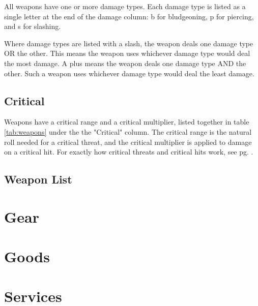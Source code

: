 \begin{multicols}{2}
    All weapons have one or more damage types. Each damage type is listed as
    a single letter at the end of the damage column: b for bludgeoning, p for
    piercing, and s for slashing.

    Where damage types are listed with a slash, the weapon deals one damage
    type OR the other. This means the weapon uses whichever damage type
    would deal the most damage. A plus means the weapon deals one damage
    type AND the other. Such a weapon uses whichever damage type would deal
    the least damage.

    \subsection{Critical}
    Weapons have a critical range and a critical multiplier, listed together
    in table \ref{tab:weapons} under the the "Critical" column. The critical
    range is the natural roll needed for a critical threat, and the critical
    multiplier is applied to damage on a critical hit. For exactly how critical
    threats and critical hits work, see pg. \pageref{combat:critical-hits}.

    \subsection{Weapon List}

    \section{Gear}

    \section{Goods}

    \section{Services}
\end{multicols}
